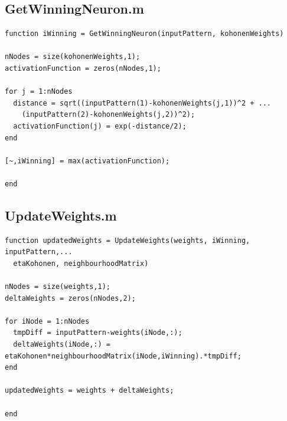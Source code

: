 \documentclass[12pt,titlepage]{article}
\begin{document}
\subsection*{GetWinningNeuron.m}
\begin{lstlisting}
function iWinning = GetWinningNeuron(inputPattern, kohonenWeights)

nNodes = size(kohonenWeights,1);
activationFunction = zeros(nNodes,1);

for j = 1:nNodes
  distance = sqrt((inputPattern(1)-kohonenWeights(j,1))^2 + ...
    (inputPattern(2)-kohonenWeights(j,2))^2);
  activationFunction(j) = exp(-distance/2);
end

[~,iWinning] = max(activationFunction);

end
\end{lstlisting}



\subsection*{UpdateWeights.m}
\begin{lstlisting}
function updatedWeights = UpdateWeights(weights, iWinning, inputPattern,...
  etaKohonen, neighbourhoodMatrix)

nNodes = size(weights,1);
deltaWeights = zeros(nNodes,2);

for iNode = 1:nNodes
  tmpDiff = inputPattern-weights(iNode,:);
  deltaWeights(iNode,:) = etaKohonen*neighbourhoodMatrix(iNode,iWinning).*tmpDiff;
end

updatedWeights = weights + deltaWeights;

end
\end{lstlisting}
\end{document}
